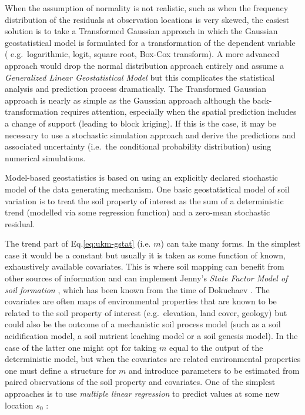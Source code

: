 \documentclass[graybox,natbib,nospthms,UStrade]{svmono}
\begin{document}
When the assumption of normality is not realistic, such as when the
frequency distribution of the residuals at observation locations is very
skewed, the easiest solution is to take a Transformed Gaussian approach
\citep[ \$\S\$3.8]{Diggle2007Springer} in which the Gaussian geostatistical model
is formulated for a transformation of the dependent variable (
e.g.~logarithmic, logit, square root, Box-Cox transform). A more advanced
approach would drop the normal distribution approach entirely and assume
a \emph{Generalized Linear Geostatistical Model}
\citep{Diggle2007Springer, Brown2014JSS} but this complicates the
statistical analysis and prediction process dramatically. The
Transformed Gaussian approach is nearly as simple as the Gaussian
approach although the back-transformation requires attention, especially
when the spatial prediction includes a change of support (leading to block kriging).
If this is the case, it may be necessary to
use a stochastic simulation approach and derive the predictions and
associated uncertainty (i.e.~the conditional probability distribution)
using numerical simulations.

Model-based geostatistics is based on using an explicitly declared
stochastic model of the data generating mechanism. One basic
geostatistical model of soil variation is to treat the soil property of
interest as the sum of a deterministic trend (modelled via some
regression function) and a zero-mean stochastic residual.

The trend part of Eq.\eqref{eq:ukm-gstat} (i.e. \(m\)) can take many forms.
In the simplest case it would be a constant but usually it is taken as
some function of known, exhaustively available covariates. This is where
soil mapping can benefit from other sources of information and can
implement Jenny's \emph{State Factor Model of soil formation}
\citep{Jenny1968, jenny1994factors, Heuvelink2001Geoderma, McBratney2011HSS},
which has been known from the time of Dokuchaev \citep{Florinsky2012Dokuchaev}.
The covariates are often maps of environmental properties that are known
to be related to the soil property of interest (e.g.~elevation, land
cover, geology) but could also be the outcome of a mechanistic soil
process model (such as a soil acidification model, a soil nutrient
leaching model or a soil genesis model). In the case of the latter one
might opt for taking \(m\) equal to the output of the deterministic model,
but when the covariates are related environmental properties one must
define a structure for \(m\) and introduce parameters to be estimated from
paired observations of the soil property and covariates. One of the
simplest approaches is to use \emph{multiple linear regression} to predict
values at some new location \({s}_0\) \citep{kutner2005applied}:
\end{document}
